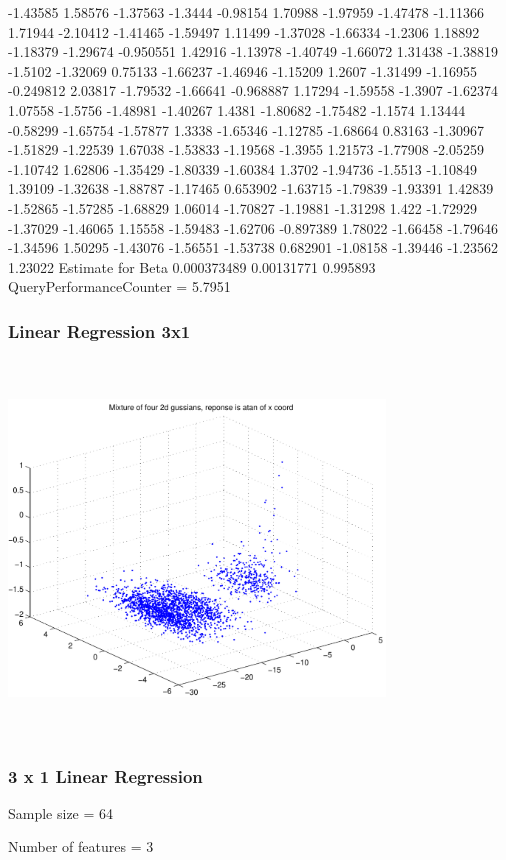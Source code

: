 \documentclass[9pt]{article}
\theoremstyle{plain}
\theoremstyle{definition}
\theoremstyle{remark}
\numberwithin{equation}{section}
\begin{document}
-1.43585
1.58576
-1.37563
-1.3444
-0.98154
1.70988
-1.97959
-1.47478
-1.11366
1.71944
-2.10412
-1.41465
-1.59497
1.11499
-1.37028
-1.66334
-1.2306
1.18892
-1.18379
-1.29674
-0.950551
1.42916
-1.13978
-1.40749
-1.66072
1.31438
-1.38819
-1.5102
-1.32069
0.75133
-1.66237
-1.46946
-1.15209
1.2607
-1.31499
-1.16955
-0.249812
2.03817
-1.79532
-1.66641
-0.968887
1.17294
-1.59558
-1.3907
-1.62374
1.07558
-1.5756
-1.48981
-1.40267
1.4381
-1.80682
-1.75482
-1.1574
1.13444
-0.58299
-1.65754
-1.57877
1.3338
-1.65346
-1.12785
-1.68664
0.83163
-1.30967
-1.51829
-1.22539
1.67038
-1.53833
-1.19568
-1.3955
1.21573
-1.77908
-2.05259
-1.10742
1.62806
-1.35429
-1.80339
-1.60384
1.3702
-1.94736
-1.5513
-1.10849
1.39109
-1.32638
-1.88787
-1.17465
0.653902
-1.63715
-1.79839
-1.93391
1.42839
-1.52865
-1.57285
-1.68829
1.06014
-1.70827
-1.19881
-1.31298
1.422
-1.72929
-1.37029
-1.46065
1.15558
-1.59483
-1.62706
-0.897389
1.78022
-1.66458
-1.79646
-1.34596
1.50295
-1.43076
-1.56551
-1.53738
0.682901
-1.08158
-1.39446
-1.23562
1.23022
Estimate for Beta
0.000373489
0.00131771
0.995893
QueryPerformanceCounter  =  5.7951
\subsubsection{Linear Regression 3x1}
\includegraphics[width=10.0cm,height=10.0cm]{AtanDataSet.pdf}

\subsubsection{3 x 1 Linear Regression}
Sample size = 64

Number of features = 3
\end{document}
